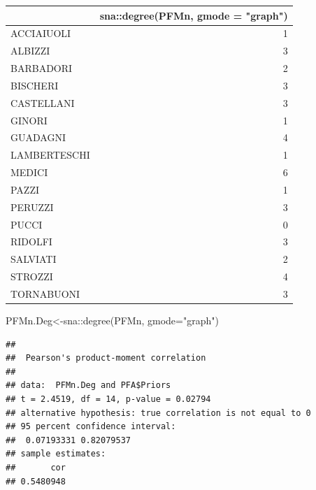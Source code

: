 \documentclass[
  notitlepage,
  onecolumn,
  openany]{book}
\newenvironment{Shaded}{\begin{snugshade}}{\end{snugshade}}
\newcommand{\AttributeTok}[1]{\textcolor[rgb]{0.77,0.63,0.00}{#1}}
\newcommand{\CommentTok}[1]{\textcolor[rgb]{0.56,0.35,0.01}{\textit{#1}}}
\newcommand{\DocumentationTok}[1]{\textcolor[rgb]{0.56,0.35,0.01}{\textbf{\textit{#1}}}}
\newcommand{\FunctionTok}[1]{\textcolor[rgb]{0.00,0.00,0.00}{#1}}
\newcommand{\NormalTok}[1]{#1}
\newcommand{\OtherTok}[1]{\textcolor[rgb]{0.56,0.35,0.01}{#1}}
\newcommand{\SpecialCharTok}[1]{\textcolor[rgb]{0.00,0.00,0.00}{#1}}
\newcommand{\StringTok}[1]{\textcolor[rgb]{0.31,0.60,0.02}{#1}}
\begin{document}
\begin{tabular}{l|r}
\hline
  & sna::degree(PFMn, gmode = "graph")\\
\hline
ACCIAIUOLI & 1\\
\hline
ALBIZZI & 3\\
\hline
BARBADORI & 2\\
\hline
BISCHERI & 3\\
\hline
CASTELLANI & 3\\
\hline
GINORI & 1\\
\hline
GUADAGNI & 4\\
\hline
LAMBERTESCHI & 1\\
\hline
MEDICI & 6\\
\hline
PAZZI & 1\\
\hline
PERUZZI & 3\\
\hline
PUCCI & 0\\
\hline
RIDOLFI & 3\\
\hline
SALVIATI & 2\\
\hline
STROZZI & 4\\
\hline
TORNABUONI & 3\\
\hline
\end{tabular}

\begin{Shaded}
\begin{Highlighting}[]
\NormalTok{PFMn.Deg}\OtherTok{\textless{}{-}}\NormalTok{sna}\SpecialCharTok{::}\FunctionTok{degree}\NormalTok{(PFMn, }\AttributeTok{gmode=}\StringTok{"graph"}\NormalTok{)}
\end{Highlighting}
\end{Shaded}

\begin{Shaded}
\end{Shaded}

\begin{verbatim}
## 
##  Pearson's product-moment correlation
## 
## data:  PFMn.Deg and PFA$Priors
## t = 2.4519, df = 14, p-value = 0.02794
## alternative hypothesis: true correlation is not equal to 0
## 95 percent confidence interval:
##  0.07193331 0.82079537
## sample estimates:
##       cor 
## 0.5480948
\end{verbatim}
\end{document}
